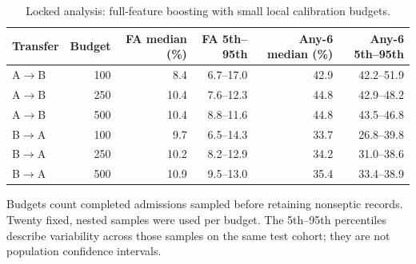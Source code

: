 \begin{table}[htbp]\centering\small
\caption{Locked analysis: full-feature boosting with small local calibration budgets.}\label{tab:budgets}
\begin{tabular}{lrrrrr}\toprule
Transfer & Budget & FA median (\%) & FA 5th--95th & Any-6 median (\%) & Any-6 5th--95th \\\midrule
A$\to$B & 100 & 8.4 & 6.7--17.0 & 42.9 & 42.2--51.9 \\
A$\to$B & 250 & 10.4 & 7.6--12.3 & 44.8 & 42.9--48.2 \\
A$\to$B & 500 & 10.4 & 8.8--11.6 & 44.8 & 43.5--46.8 \\
B$\to$A & 100 & 9.7 & 6.5--14.3 & 33.7 & 26.8--39.8 \\
B$\to$A & 250 & 10.2 & 8.2--12.9 & 34.2 & 31.0--38.6 \\
B$\to$A & 500 & 10.9 & 9.5--13.0 & 35.4 & 33.4--38.9 \\
\bottomrule\end{tabular}
\par\vspace{3pt}\begin{minipage}{.98\linewidth}\footnotesize Budgets count completed admissions sampled before retaining nonseptic records. Twenty fixed, nested samples were used per budget. The 5th--95th percentiles describe variability across those samples on the same test cohort; they are not population confidence intervals.\end{minipage}
\end{table}
